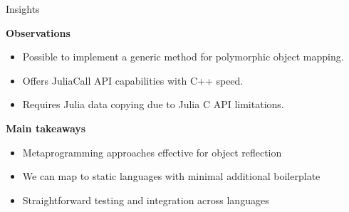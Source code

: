 \begin{frame}{Insights}
    
    \textbf{Observations}
    \begin{itemize}
      \item Possible to implement a generic method for polymorphic object mapping.
      \item Offers JuliaCall API capabilities with C++ speed.
      \item Requires Julia data copying due to Julia C API limitations.
    \end{itemize}
    \pause
    \textbf{Main takeaways}
    \begin{itemize}
      \item Metaprogramming approaches effective for object reflection
      \item We can map to static languages with minimal additional boilerplate
      \item Straightforward testing and integration across languages
    \end{itemize}
    \end{frame}
    
